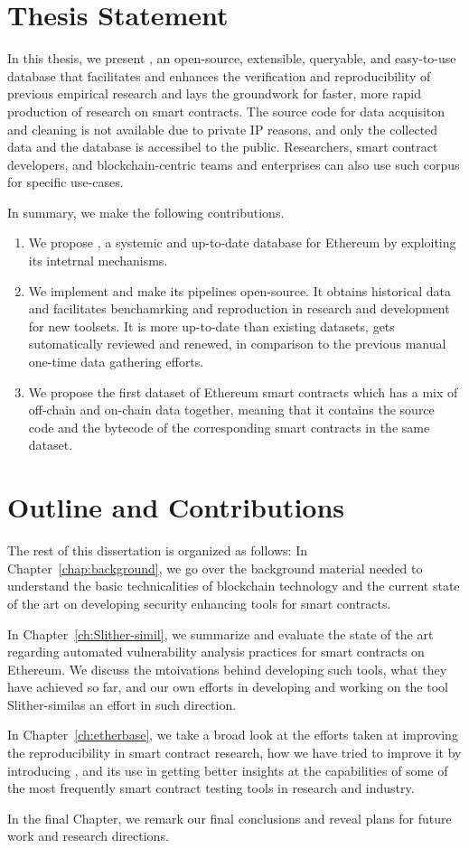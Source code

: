 \section{Thesis Statement}
  In this thesis, we present \etherbase, an open-source, extensible, queryable, and easy-to-use database that facilitates and enhances the verification and reproducibility of previous empirical research and lays the groundwork for faster, more rapid production of research on smart contracts.
  The source code for data acquisiton and cleaning is not available due to private IP reasons, and only the collected data and the database is accessibel to the public.
  Researchers, smart contract developers, and blockchain-centric teams and enterprises can also use such corpus for specific use-cases.

  In summary, we make the following contributions.
  \begin{enumerate}
    \item We propose \etherbase, a systemic and up-to-date database for Ethereum by exploiting its intetrnal mechanisms.
    \item We implement \etherbase and make its pipelines open-source. It obtains historical data and facilitates benchamrking and reproduction in research and development for new toolsets. It is more up-to-date than existing datasets, gets sutomatically reviewed and renewed, in comparison to the previous manual one-time data gathering efforts.
    \item We propose the first dataset of Ethereum smart contracts which has a mix of off-chain and on-chain data together, meaning that it contains the source code and the bytecode of the corresponding smart contracts in the same dataset.
  \end{enumerate}


\section{Outline and Contributions}

  The rest of this dissertation is organized as follows:
  In Chapter~\ref{chap:background}, we go over the background material needed to understand the basic technicalities of blockchain technology and the current state of the art on developing security enhancing tools for smart contracts.

  In Chapter~\ref{ch:Slither-simil}, we summarize and evaluate the state of the art regarding automated vulnerability analysis practices for smart contracts on Ethereum.
  We discuss the mtoivations behind developing such tools, what they have achieved so far, and our own efforts in developing and working on the tool Slither-similas an effort in such direction.

  In Chapter~\ref{ch:etherbase}, we take a broad look at the efforts taken at improving the reproducibility in smart contract research, how we have tried to improve it by introducing \etherbase, and its use in getting better insights at the capabilities of some of the most frequently smart contract testing tools in research and industry.

  In the final Chapter, we remark our final conclusions and reveal plans for future work and research directions.